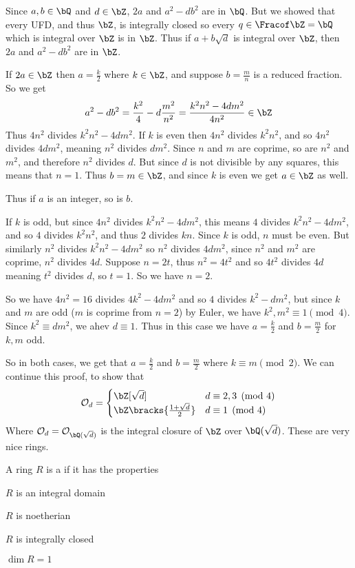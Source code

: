 \documentclass[10pt]{article}
\def\mO{\mathcal O}
\begin{document}
Since $a,b\in\bQ$ and $d\in\bZ$, $2a$ and $a^2-db^2$ are in $\bQ$.
But we showed that every UFD, and thus $\bZ$, is integrally closed so every $q\in\Fracof\bZ=\bQ$ which is integral over $\bZ$ is in $\bZ$.
Thus if $a+b\sqrt d$ is integral over $\bZ$, then $2a$ and $a^2-db^2$ are in $\bZ$.

If $2a\in\bZ$ then $a=\frac k2$ where $k\in\bZ$, and suppose $b=\frac mn$ is a reduced fraction.
So we get
\[ a^2-db^2 = \frac{k^2}4 - d\frac{m^2}{n^2} = \frac{k^2n^2-4dm^2}{4n^2} \in \bZ \]
Thus $4n^2$ divides $k^2n^2-4dm^2$.
If $k$ is even then $4n^2$ divides $k^2n^2$, and so $4n^2$ divides $4dm^2$, meaning $n^2$ divides $dm^2$.
Since $n$ and $m$ are coprime, so are $n^2$ and $m^2$, and therefore $n^2$ divides $d$.
But since $d$ is not divisible by any squares, this means that $n=1$.
Thus $b=m\in\bZ$, and since $k$ is even we get $a\in\bZ$ as well.

Thus if $a$ is an integer, so is $b$.

If $k$ is odd, but since $4n^2$ divides $k^2n^2-4dm^2$, this means $4$ divides $k^2n^2-4dm^2$, and so $4$ divides $k^2n^2$, and thus $2$ divides $kn$.
Since $k$ is odd, $n$ must be even.
But similarly $n^2$ divides $k^2n^2-4dm^2$ so $n^2$ divides $4dm^2$, since $n^2$ and $m^2$ are coprime, $n^2$ divides $4d$.
Suppose $n=2t$, thus $n^2=4t^2$ and so $4t^2$ divides $4d$ meaning $t^2$ divides $d$, so $t=1$.
So we have $n=2$.

So we have $4n^2=16$ divides $4k^2-4dm^2$ and so $4$ divides $k^2-dm^2$, but since $k$ and $m$ are odd ($m$ is coprime from $n=2$) by Euler, we have $k^2,m^2\equiv1\pmod4$.
Since $k^2\equiv dm^2$, we ahev $d\equiv1$.
Thus in this case we have $a=\frac k2$ and $b=\frac m2$ for $k,m$ odd.

\newpage
So in both cases, we get that $a=\frac k2$ and $b=\frac m2$ where $k\equiv m\pmod2$.
We can continue this proof, to show that
\[ \mO_d = \begin{cases} \bZ[\sqrt d] & d\equiv2,3\pmod4 \\ \bZ\bracks{\frac{1+\sqrt d}2} & d\equiv1\pmod4 \end{cases} \]
Where $\mO_d=\mO_{\bQ(\sqrt d)}$ is the integral closure of $\bZ$ over $\bQ(\sqrt d)$.
These are very nice rings.

\begin{defn*}

    A ring $R$ is a  if it has the properties
    \benum
        \item $R$ is an integral domain
        \item $R$ is noetherian
        \item $R$ is integrally closed
        \item $\dim R=1$
    \eenum

\end{defn*}
\end{document}
